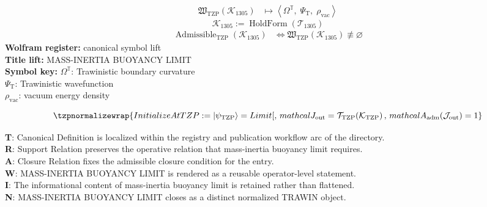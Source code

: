 \noindent
\begin{minipage}[t]{0.48\linewidth}
\begingroup
\small
\[
\begin{aligned}
\mathfrak{W}_{\mathrm{TZP}}\!\left(\mathcal{K}_{1305}\right)
&\longmapsto
\left\langle \Omega^{\mathbb{T}},\; \Psi_{\mathrm{T}},\; \rho_{\mathrm{vac}} \right\rangle
\end{aligned}
\]
\[
\mathcal{K}_{1305}
:=
\operatorname{HoldForm}\!\left(\mathcal{T}_{1305}\right)
\]
\[
\begin{aligned}
\operatorname{Admissible}_{\mathrm{TZP}}\!\left(\mathcal{K}_{1305}\right)
&\Longleftrightarrow
\mathfrak{W}_{\mathrm{TZP}}\!\left(\mathcal{K}_{1305}\right)\not\equiv\varnothing
\end{aligned}
\]
\textbf{Wolfram register:} canonical symbol lift\\
\textbf{Title lift:} MASS-INERTIA BUOYANCY LIMIT\\
\textbf{Symbol key:} \(\Omega^{\mathbb{T}}\): Trawinistic boundary curvature\\ \(\Psi_{\mathrm{T}}\): Trawinistic wavefunction\\ \(\rho_{\mathrm{vac}}\): vacuum energy density
\par
\endgroup
\end{minipage}\hfill
\begin{minipage}[t]{0.48\linewidth}
\[
\tzpnormalizewrap{InitializeAtTZP := \lvert \psi_{\mathrm{TZP}} \rangle = Limit[,\,mathcal{J}_{\mathrm{out}} = \mathcal{T}_{\mathrm{TZP}}\!\left(\mathcal{K}_{\mathrm{TZP}}\right),\,mathcal{A}_{\mathrm{adm}}\!\left(\mathcal{J}_{\mathrm{out}}\right)=1}
\]

\small
\textbf{T}: Canonical Definition is localized within the registry and publication workflow arc of the directory.\\
\textbf{R}: Support Relation preserves the operative relation that mass-inertia buoyancy limit requires.\\
\textbf{A}: Closure Relation fixes the admissible closure condition for the entry.\\
\textbf{W}: MASS-INERTIA BUOYANCY LIMIT is rendered as a reusable operator-level statement.\\
\textbf{I}: The informational content of mass-inertia buoyancy limit is retained rather than flattened.\\
\textbf{N}: MASS-INERTIA BUOYANCY LIMIT closes as a distinct normalized TRAWIN object.
\normalsize
\end{minipage}

